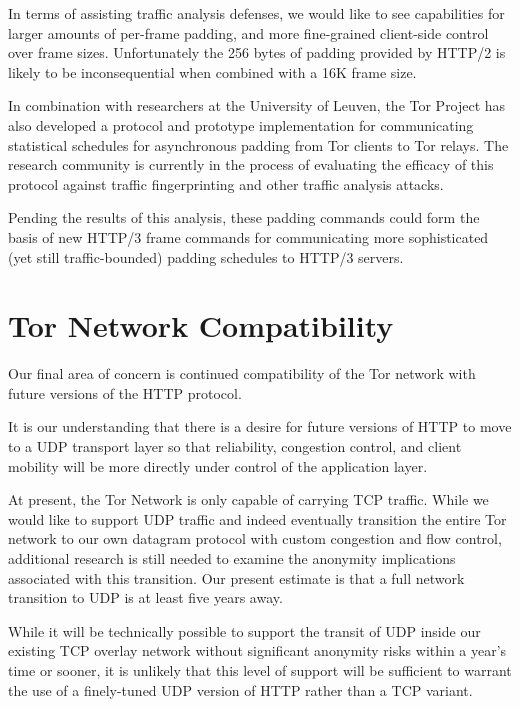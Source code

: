 \documentclass[letterpaper,11pt]{llncs}
\begin{document}
In terms of assisting traffic analysis defenses, we would like to see
capabilities for larger amounts of per-frame padding, and more fine-grained
client-side control over frame sizes. Unfortunately the 256 bytes of padding
provided by HTTP/2 is likely to be inconsequential when combined with a 16K
frame size.

In combination with researchers at the University of Leuven, the Tor Project
has also developed a protocol and prototype implementation for communicating
statistical schedules for asynchronous padding from Tor clients to Tor relays.
The research community is currently in the process of evaluating the efficacy
of this protocol against traffic fingerprinting and other traffic analysis
attacks.

Pending the results of this analysis, these padding commands could form the
basis of new HTTP/3 frame commands for communicating more sophisticated (yet
still traffic-bounded) padding schedules to HTTP/3 servers.


\section{Tor Network Compatibility}

Our final area of concern is continued compatibility of the Tor network with
future versions of the HTTP protocol.

It is our understanding that there is a desire for future versions of HTTP to
move to a UDP transport layer so that reliability, congestion control, and
client mobility will be more directly under control of the application layer.

At present, the Tor Network is only capable of carrying TCP traffic. While we
would like to support UDP traffic and indeed eventually transition the entire
Tor network to our own datagram protocol with custom congestion and flow
control, additional research is still needed to examine the anonymity
implications associated with this transition. Our present estimate is that a
full network transition to UDP is at least five years away.


While it will be technically possible to support the transit of UDP inside our
existing TCP overlay network without significant anonymity risks within a
year's time or sooner, it is unlikely that this level of support will be
sufficient to warrant the use of a finely-tuned UDP version of HTTP rather
than a TCP variant.
\end{document}
